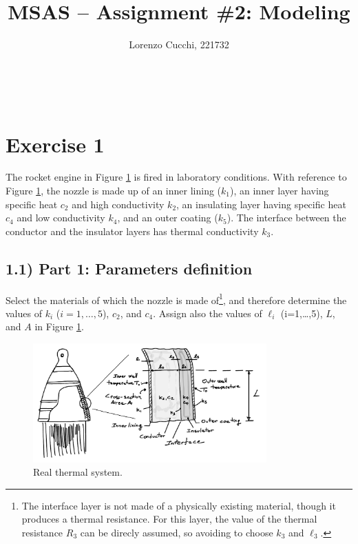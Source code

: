 \documentclass[11pt,a4paper,oneside]{article}
\title{MSAS -- Assignment \#2: Modeling} %
\author{\large Lorenzo Cucchi, 221732}
\date{}
\makeatletter
\newcommand\headlinecolor{\normalcolor}
\renewcommand*\maketitle{%
    \begingroup
    \centering
    \fontsize{15}{15}%
    \selectfont
    \headlinecolor
    \@title\\
    \vspace{5mm}
    \@author
    \par
    \vskip1in
    \endgroup
    \vspace{-22mm}
}
\makeatother
\begin{document}
\maketitle

\thispagestyle{fancy}


\section*{Exercise 1}
The rocket engine in Figure \ref{fig:therm} is fired in laboratory conditions. With reference to Figure \ref{fig:therm}, the nozzle is made up of an inner lining ($k_1$), an inner layer having specific heat $c_2$ and high conductivity $k_2$, an insulating layer having specific heat $c_4$ and low conductivity $k_4$, and an outer coating ($k_5$). The interface between the conductor and the insulator layers has thermal conductivity $k_3$.

\subsection*{1.1) Part 1: Parameters definition}
Select the materials of which the nozzle is made of\footnote{The interface layer is not made of a physically existing material, though it produces a thermal resistance. For this layer, the value of the thermal resistance $R_3$ can be direcly assumed, so avoiding to choose $k_3$ and $\ell_3$.}, and therefore determine the values of $k_i$ ($i=1,\dots,5$), $c_2$, and $c_4$. Assign also the values of $\ell_i$ (i=1,\dots,5), $L$, and $A$ in Figure \ref{fig:therm}.
\begin{figure}[h!]
\centering
\includegraphics[width=0.8\textwidth]{gfx/fig_therm.pdf}
\caption{\label{fig:therm} Real thermal system.}
\end{figure}
\end{document}
